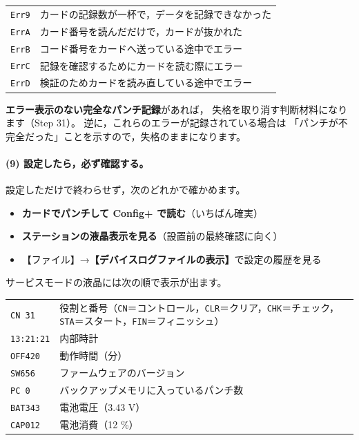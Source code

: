 \begin{center}
\small
\begin{tabular}{@{}P{16mm}P{128mm}@{}}
\toprule
{} &  \\
\midrule
\texttt{Err9} & カードの記録数が一杯で，データを記録できなかった \\
\texttt{ErrA} & カード番号を読んだだけで，カードが抜かれた \\
\texttt{ErrB} & コード番号をカードへ送っている途中でエラー \\
\texttt{ErrC} & 記録を確認するためにカードを読む際にエラー \\
\texttt{ErrD} & 検証のためカードを読み直している途中でエラー \\
\bottomrule
\end{tabular}
\end{center}

\textbf{エラー表示のない完全なパンチ記録}があれば，
失格を取り消す判断材料になります（Step 31）。
逆に，これらのエラーが記録されている場合は
「パンチが不完全だった」ことを示すので，失格のままになります。

\paragraph{(9) 設定したら，必ず確認する。}
設定しただけで終わらせず，次のどれかで確かめます。

\begin{itemize}
\item \textbf{カードでパンチして Config+ で読む}（いちばん確実）
\item \textbf{ステーションの液晶表示を見る}（設置前の最終確認に向く）
\item 【ファイル】→\textbf{【デバイスログファイルの表示】}で設定の履歴を見る
\end{itemize}

サービスモードの液晶には次の順で表示が出ます。

\begin{center}
\small
\begin{tabular}{@{}P{22mm}P{122mm}@{}}
\toprule
\texttt{CN 31} & 役割と番号（\texttt{CN}＝コントロール，\texttt{CLR}＝クリア，\texttt{CHK}＝チェック，
                 \texttt{STA}＝スタート，\texttt{FIN}＝フィニッシュ） \\
\texttt{13:21:21} & 内部時計 \\
\texttt{OFF420} & 動作時間（分） \\
\texttt{SW656} & ファームウェアのバージョン \\
\texttt{PC 0} & バックアップメモリに入っているパンチ数 \\
\texttt{BAT343} & 電池電圧（3.43 V） \\
\texttt{CAP012} & 電池消費（12 \%） \\
\bottomrule
\end{tabular}
\end{center}

